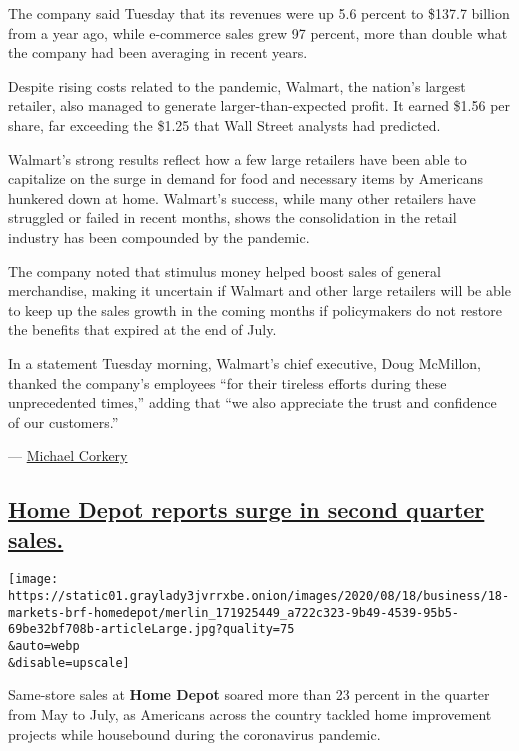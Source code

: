 The company said Tuesday that its revenues were up 5.6 percent to
\$137.7 billion from a year ago, while e-commerce sales grew 97 percent,
more than double what the company had been averaging in recent years.

Despite rising costs related to the pandemic, Walmart, the nation's
largest retailer, also managed to generate larger-than-expected profit.
It earned \$1.56 per share, far exceeding the \$1.25 that Wall Street
analysts had predicted.

Walmart's strong results reflect how a few large retailers have been
able to capitalize on the surge in demand for food and necessary items
by Americans hunkered down at home. Walmart's success, while many other
retailers have struggled or failed in recent months, shows the
consolidation in the retail industry has been compounded by the
pandemic.

The company noted that stimulus money helped boost sales of general
merchandise, making it uncertain if Walmart and other large retailers
will be able to keep up the sales growth in the coming months if
policymakers do not restore the benefits that expired at the end of
July.

In a statement Tuesday morning, Walmart's chief executive, Doug
McMillon, thanked the company's employees ``for their tireless efforts
during these unprecedented times,'' adding that ``we also appreciate the
trust and confidence of our customers.''

--- \href{https://www.nytimes3xbfgragh.onion/by/michael-corkery}{Michael
Corkery}

\hypertarget{home-depot-reports-surge-in-second-quarter-sales}{%
\subsection{\texorpdfstring{\protect\hyperlink{home-depot-reports-surge-in-second-quarter-sales}{Home
Depot reports surge in second quarter
sales.}}{Home Depot reports surge in second quarter sales.}}\label{home-depot-reports-surge-in-second-quarter-sales}}

\texttt{[image: https://static01.graylady3jvrrxbe.onion/images/2020/08/18/business/18-markets-brf-homedepot/merlin\_171925449\_a722c323-9b49-4539-95b5-69be32bf708b-articleLarge.jpg?quality=75\\\&auto=webp\\\&disable=upscale]}

Same-store sales at \textbf{Home Depot} soared more than 23 percent in
the quarter from May to July, as Americans across the country tackled
home improvement projects while housebound during the coronavirus
pandemic.

